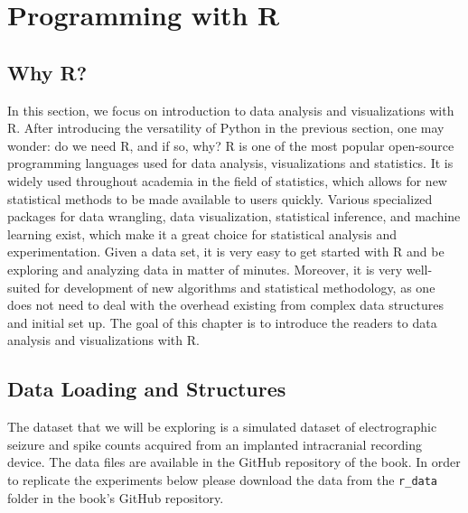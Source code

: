 

\section{Programming with R}

\subsection{Why R?}

In this section, we focus on introduction to data analysis and visualizations with R. After introducing the versatility of Python in the previous section, one may wonder: do we need R, and if so, why? R is one of the most popular open-source programming languages used for data analysis, visualizations and statistics. %
It is widely used throughout academia in the field of statistics, which allows for new statistical methods to be made available to users quickly. Various specialized packages for data wrangling, data visualization, statistical inference, and machine learning exist, which make it a great choice for statistical analysis and experimentation. Given a data set, it is very easy to get started with R and be exploring and analyzing data in matter of minutes. Moreover, it is very well-suited for development of new algorithms and statistical methodology, as one does not need to deal with the overhead existing from complex data structures and initial set up. The goal of this chapter is to introduce the readers to data analysis and visualizations with R.

\subsection{Data Loading and Structures}
The dataset that we will be exploring is a simulated dataset of electrographic seizure and spike counts acquired from an implanted intracranial recording device. The data files are available in the GitHub repository of the book. In order to replicate the experiments below please download the data from the \verb|r_data| folder in the book's GitHub repository.

